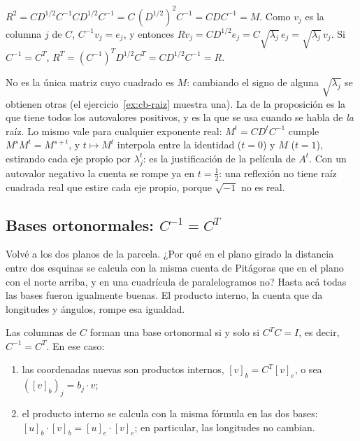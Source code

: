 \begin{demostracion}
\(R^2=CD^{1/2}C^{-1}CD^{1/2}C^{-1}=C\,(D^{1/2})^2C^{-1}=CDC^{-1}=M\). Como \(v_j\) es la
columna \(j\) de \(C\), \(C^{-1}v_j=e_j\), y entonces
\(Rv_j=CD^{1/2}e_j=C\sqrt{\lambda_j}\,e_j=\sqrt{\lambda_j}\,v_j\). Si \(C^{-1}=C^T\),
\(R^T=(C^{-1})^TD^{1/2}C^T=CD^{1/2}C^{-1}=R\).
\end{demostracion}

No es la única matriz cuyo cuadrado es \(M\): cambiando el signo de alguna \(\sqrt{\lambda_j}\)
se obtienen otras (el ejercicio~\ref{ex:cb-raiz} muestra una). La de la proposición es la que
tiene todos los autovalores positivos, y es la que se usa cuando se habla de \emph{la} raíz.
Lo mismo vale para cualquier exponente real: \(M^t=CD^tC^{-1}\) cumple \(M^sM^t=M^{s+t}\), y
\(t\mapsto M^t\) interpola entre la identidad (\(t=0\)) y \(M\) (\(t=1\)), estirando cada eje
propio por \(\lambda_j^t\): es la justificación de la película de \(A^t\). Con un autovalor negativo la cuenta se rompe ya en
\(t=\tfrac12\): una reflexión no tiene raíz cuadrada real que estire cada eje propio, porque
\(\sqrt{-1}\) no es real.

\subsection{Bases ortonormales: \texorpdfstring{\(C^{-1}=C^T\)}{C inversa = C traspuesta}}\label{sec:bases-ortonormales}

Volvé a los dos planos de la parcela. ¿Por qué en el plano girado la distancia entre dos
esquinas se calcula con la misma cuenta de Pitágoras que en el plano con el norte arriba, y en
una cuadrícula de paralelogramos no? Hasta acá todas las bases fueron igualmente buenas. El
producto interno, la cuenta que da longitudes y ángulos, rompe esa igualdad.

\begin{proposicion}\label{prop:cb-ortonormal}
Las columnas de \(C\) forman una base ortonormal si y solo si \(C^TC=I\), es decir,
\(C^{-1}=C^T\). En ese caso:
\begin{enumerate}
  \item las coordenadas nuevas son productos internos, \([v]_b=C^T[v]_e\), o sea
  \(([v]_b)_j=b_j\cdot v\);
  \item el producto interno se calcula con la misma fórmula en las dos bases:
  \([u]_b\cdot[v]_b=[u]_e\cdot[v]_e\); en particular, las longitudes no cambian.
\end{enumerate}
\end{proposicion}

